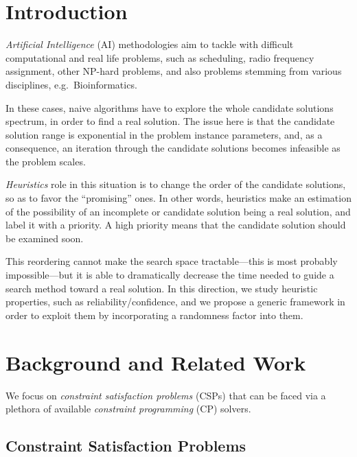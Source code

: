 \documentclass{ws-ijait}
\begin{document}


\section{Introduction}

\emph{Artificial Intelligence} (AI) methodologies aim to tackle with difficult computational and real life problems, such as scheduling,\cite{pinedo-scheduling} radio frequency assignment,\cite{radio-link} other NP-hard problems, and also problems stemming from various disciplines, e.g.\ Bioinformatics.\cite{bioinformatics}

In these cases, naive algorithms have to explore the whole candidate solutions spectrum, in order to find a real solution. The issue here is that the candidate solution range is exponential in the problem instance parameters, and, as a consequence, an iteration through the candidate solutions becomes infeasible as the problem scales.

\emph{Heuristics} role in this situation is to change the order of the candidate solutions, so as to favor the ``promising'' ones. In other words, heuristics make an estimation of the possibility of an incomplete or candidate solution being a real solution, and label it with a priority. A high priority means that the candidate solution should be examined soon.

This reordering cannot make the search space tractable---this is most probably impossible\cite{p-np}---but it is able to dramatically decrease the time needed to guide a search method toward a real solution. In this direction, we study heuristic properties, such as reliability\slash confidence, and we propose a generic framework in order to exploit them by incorporating a randomness factor into them.


\section{Background and Related Work}

We focus on \emph{constraint satisfaction problems} (CSPs)\cite{CSP} that can be faced via a plethora of available \emph{constraint programming} (CP) solvers.\cite{eclipse,ilog}


\subsection{Constraint Satisfaction Problems}
\end{document}
